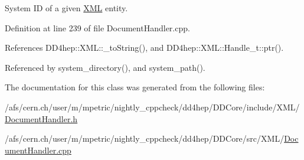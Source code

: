 System ID of a given \hyperlink{namespace_d_d4hep_1_1_x_m_l}{XML} entity. 

Definition at line 239 of file DocumentHandler.cpp.

References DD4hep::XML::\_\-toString(), and DD4hep::XML::Handle\_\-t::ptr().

Referenced by system\_\-directory(), and system\_\-path().

The documentation for this class was generated from the following files:\begin{DoxyCompactItemize}
\item 
/afs/cern.ch/user/m/mpetric/nightly\_\-cppcheck/dd4hep/DDCore/include/XML/\hyperlink{_document_handler_8h}{DocumentHandler.h}\item 
/afs/cern.ch/user/m/mpetric/nightly\_\-cppcheck/dd4hep/DDCore/src/XML/\hyperlink{_document_handler_8cpp}{DocumentHandler.cpp}\end{DoxyCompactItemize}
